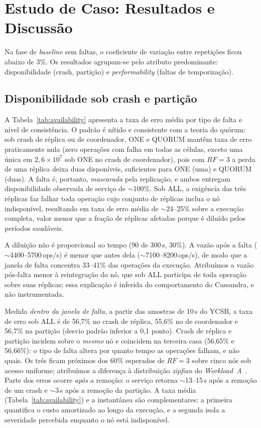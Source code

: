 \documentclass[runningheads]{llncs}
\begin{document}
\section{Estudo de Caso: Resultados e Discussão}
\label{sec:casestudy}

Na fase de \emph{baseline} sem faltas, o coeficiente de variação entre
repetições ficou abaixo de 3\%. Os resultados agrupam-se pelo atributo
predominante: disponibilidade (crash, partição) e \emph{performability} (faltas
de temporização).

\subsection{Disponibilidade sob crash e partição}

A Tabela~\ref{tab:availability} apresenta a taxa de erro média por tipo de falta
e nível de consistência. O padrão é nítido e consistente com a teoria do quórum:
sob crash de réplica ou de coordenador, ONE e QUORUM mantêm taxa de erro
praticamente nula (zero operações com falha em todas as células, exceto uma
única em $2{,}6\times10^{7}$ sob ONE no crash de coordenador), pois com $RF=3$ a
perda de uma réplica deixa duas disponíveis, suficientes para ONE (uma) e QUORUM
(duas). A falta é, portanto, \emph{mascarada} pela replicação, e ambos
entregam disponibilidade observada de serviço de $\sim$100\%. Sob ALL, a
exigência das três réplicas faz falhar toda operação cujo conjunto de réplicas
inclua o nó indisponível, resultando em taxa de erro média de $\sim$24--25\%
sobre a execução completa, valor menor que a fração de réplicas afetadas
porque é diluído pelos períodos saudáveis.

A diluição não é proporcional ao tempo (90 de 300\,s, 30\%). A vazão após a
falta ($\sim$4400--5700\,ops/s) é menor que antes dela ($\sim$7100--8200\,ops/s),
de modo que a janela de falta concentra 33--41\% das operações da execução.
Atribuímos a vazão pós-falta menor à reintegração do nó, que sob ALL participa de
toda operação sobre suas réplicas; essa explicação é inferida do comportamento do
Cassandra, e não instrumentada.

Medida \emph{dentro da janela de falta}, a partir das amostras de 10\,s do YCSB,
a taxa de erro sob ALL é de 56,7\% no crash de réplica, 55,6\% no de coordenador
e 56,7\% na partição (desvio padrão inferior a 0,1 ponto). Crash de réplica e
partição incidem sobre o \emph{mesmo} nó e coincidem na terceira casa (56,65\% e
56,66\%): o tipo de falta altera por quanto tempo as operações falham, e não
quais. Os três ficam próximos dos 60\% esperados de $RF=3$ sobre cinco nós sob
acesso uniforme; atribuímos a diferença à distribuição \emph{zipfian} do
\emph{Workload~A}~\cite{ycsb}. Parte dos erros ocorre \emph{após} a remoção: o
serviço retorna $\sim$13--15\,s após a remoção de um crash e $\sim$3\,s após a
remoção da partição. A taxa média (Tabela~\ref{tab:availability}) e a
instantânea são complementares: a primeira quantifica o custo amortizado ao longo
da execução, e a segunda isola a severidade percebida enquanto o nó está
indisponível.
\end{document}
